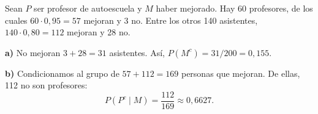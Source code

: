 Sean $P$ ser profesor de autoescuela y $M$ haber mejorado. Hay 60 profesores, de los cuales $60\cdot0{,}95=57$ mejoran y 3 no. Entre los otros 140 asistentes, $140\cdot0{,}80=112$ mejoran y 28 no.

\textbf{a)} No mejoran $3+28=31$ asistentes. Así, $P(M^c)=31/200=\boxed{0{,}155}$.

\textbf{b)} Condicionamos al grupo de $57+112=169$ personas que mejoran. De ellas, 112 no son profesores:
\[
 P(P^c\mid M)=\boxed{\frac{112}{169}}\approx0{,}6627.
\]
